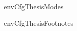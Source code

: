\environment envCfgThesisModes

\startenvironment envCfgThesisFootnotes

\startmode[draft]


\stopmode

\startmode[print]

\setupfootnotes[location=text]

\stopmode


\stopenvironment